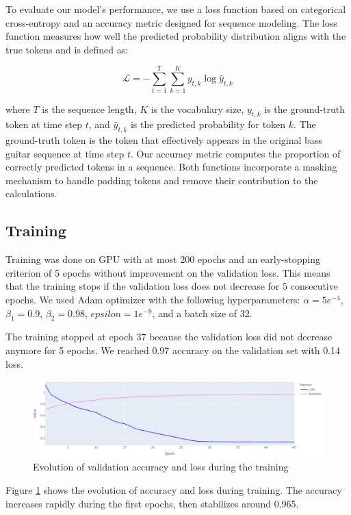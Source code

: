 To evaluate our model's performance, we use a loss function based on categorical cross-entropy and an accuracy metric designed for sequence modeling.
The loss function measures how well the predicted probability distribution aligns with the true tokens and is defined as:  

\begin{equation} \label{eq:loss}
    \mathcal{L} = - \sum_{t=1}^{T} \sum_{k=1}^{K} y_{t,k} \log \hat{y}_{t,k}
\end{equation}
    
where \( T \) is the sequence length, \( K \) is the vocabulary size, \( y_{t,k} \) is the ground-truth token at time step \( t \), and \( \hat{y}_{t,k} \) is the predicted probability for token \( k \).
The ground-truth token is the token that effectively appears in the original bass guitar sequence at time step \( t \).
Our accuracy metric computes the proportion of correctly predicted tokens in a sequence.
Both functions incorporate a masking mechanism to handle padding tokens and remove their contribution to the calculations.


\subsection{Training}

Training was done on GPU with at most 200 epochs and an early-stopping criterion of 5 epochs without improvement on the validation loss.
This means that the training stops if the validation loss does not decrease for 5 consecutive epochs.
We used Adam optimizer with the following hyperparameters: $\alpha=5e^{-4}$, $\beta_1=0.9$, $\beta_2=0.98$, $epsilon=1e^{-9}$, and a batch size of 32.

The training stopped at epoch 37 because the validation loss did not decrease anymore for 5 epochs.
We reached 0.97 accuracy on the validation set with 0.14 loss.

\begin{figure}[!ht]
    \centering
    \includegraphics[width=.8\linewidth]{../images-figures/validation_acc_loss.png}
    \caption{Evolution of validation accuracy and loss during the training}
    \label{fig:validation_acc_loss}
\end{figure}

Figure \ref{fig:validation_acc_loss} shows the evolution of accuracy and loss during training.
The accuracy increases rapidly during the first epochs, then stabilizes around 0.965.